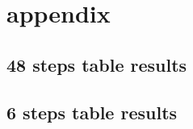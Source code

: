\section{appendix}
\subsection{48 steps table results}

\newpage
\subsection{6 steps table results}

\newpage
